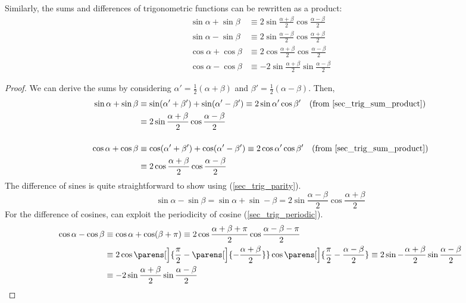 \begin{theorem}
Similarly, the sums and differences of trigonometric functions can be rewritten
as a product:
\begin{align*}
\sin \alpha + \sin \beta &\equiv
    2 \sin \frac{\alpha + \beta}2 \cos \frac{\alpha - \beta}2 \\
\sin \alpha - \sin \beta &\equiv
    2 \sin \frac{\alpha - \beta} 2 \cos\frac{\alpha + \beta} 2 \\
\cos \alpha + \cos \beta &\equiv
    2 \cos\frac{\alpha + \beta} 2 \cos \frac{\alpha - \beta} 2 \\
\cos \alpha - \cos \beta &\equiv
 -2 \sin \frac{\alpha + \beta} 2 \sin \frac{\alpha - \beta} 2
\end{align*}
\end{theorem}
\begin{proof}
We can derive the sums by considering \(\alpha' = \frac 12 (\alpha + \beta)\)
and \(\beta' = \frac 12 (\alpha - \beta)\). Then,
\begin{align*}
\sin \alpha + \sin \beta &\equiv
 \sin(\alpha' + \beta') + \sin(\alpha' - \beta') \equiv
 2\sin \alpha' \cos \beta'\quad \text{(from \ref{sec_trig_sum_product})}
\\&\equiv 2 \sin \frac{\alpha + \beta}2 \cos \frac{\alpha - \beta} 2 \\[3ex]
 \cos \alpha + \cos \beta &\equiv
 \cos(\alpha' + \beta') + \cos(\alpha' - \beta') \equiv
 2\cos \alpha' \cos \beta'\quad \text{(from \ref{sec_trig_sum_product})}
 \\&\equiv 2 \cos\frac{\alpha + \beta} 2 \cos \frac{\alpha - \beta} 2
\end{align*}
The difference of sines is quite straightforward to show using
(\ref{sec_trig_parity}).
\begin{equation*}
\sin \alpha - \sin \beta =
    \sin \alpha + \sin -\beta =
    2 \sin \frac{\alpha - \beta} 2 \cos\frac{\alpha + \beta} 2
\end{equation*}
For the difference of cosines, can exploit the periodicity of cosine
(\ref{sec_trig_periodic}).
\begin{align*}
 \cos \alpha - \cos \beta &\equiv
 \cos \alpha + \cos (\beta + \pi)  \equiv
 2 \cos \frac{\alpha + \beta + \pi} 2 \cos \frac {\alpha - \beta - \pi} 2
 \\&\equiv
 2 \cos \parens[\Big]{\frac \pi 2 - \parens[\Big]{-\frac{\alpha + \beta} 2}}
   \cos \parens[\Big]{\frac \pi 2 - \frac{\alpha - \beta} 2} \equiv
 2 \sin -\frac{\alpha + \beta} 2 \sin \frac{\alpha - \beta} 2 \\&\equiv
 -2 \sin \frac{\alpha + \beta} 2 \sin \frac{\alpha - \beta} 2 \qedhere
\end{align*}
\end{proof}

